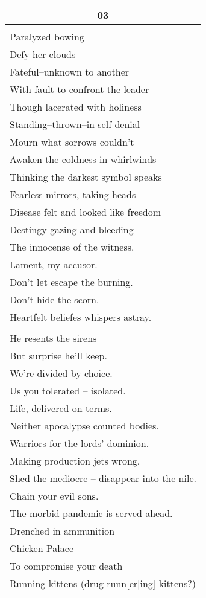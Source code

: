 \documentclass{article}
\begin{document}
\begin{center}
\begin{tabular}{l}
\multicolumn{1}{c}{\textbf{--- 03 ---}} \\ \hline
\\
Paralyzed bowing \\
Defy her clouds \\
Fateful--unknown to another \\
With fault to confront the leader \\
Though lacerated with holiness \\
Standing--thrown--in self-denial \\
Mourn what sorrows couldn't \\
Awaken the coldness in whirlwinds \\
Thinking the darkest symbol speaks \\
Fearless mirrors, taking heads \\
Disease felt and looked like freedom \\
Destingy gazing and bleeding \\
The innocense of the witness. \\
Lament, my accusor. \\
Don't let escape the burning. \\
Don't hide the scorn. \\
Heartfelt beliefes whispers astray. \\
\\
He resents the sirens \\
But surprise he'll keep. \\
We're divided by choice. \\
Us you tolerated -- isolated. \\
Life, delivered on terms. \\
Neither apocalypse counted bodies. \\
Warriors for the lords' dominion. \\
Making production jets wrong. \\
Shed the mediocre -- disappear into the nile. \\
Chain your evil sons. \\
The morbid pandemic is served ahead. \\
Drenched in ammunition \\
Chicken Palace \\
To compromise your death \\
Running kittens (drug runn[er|ing] kittens?) \\
\end{tabular}
\end{center}
\end{document}
